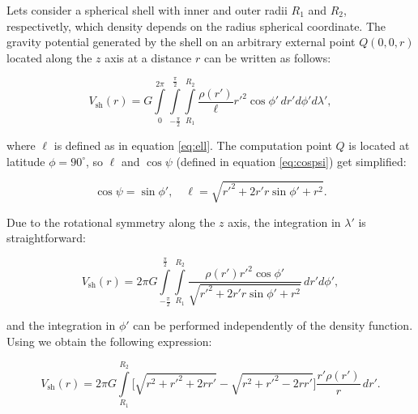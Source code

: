 \documentclass[extra]{gji}
\begin{document}
Lets consider a spherical shell with inner and outer radii $R_1$ and $R_2$, respectivetly, which density depends on the radius spherical coordinate.
The gravity potential generated by the shell on an arbitrary external point $Q(0,0,r)$ located along the $z$ axis at a distance $r$ can be written as follows:


\begin{equation}
    V_\text{sh}(r) = G 
    \int\limits_0^{2\pi}
    \int\limits_{-\frac{\pi}{2}}^\frac{\pi}{2}
    \int\limits_{R_1}^{R_2}
    \frac{\rho(r')}{\ell} {r'}^2 \cos\phi' \, 
    dr' d\phi' d\lambda',
\end{equation}

\noindent where $\ell$ is defined as in equation \ref{eq:ell}.
The computation point $Q$ is located at latitude $\phi=90^\circ$, so $\ell$ and $\cos\psi$ (defined in equation \ref{eq:cospsi}) get simplified:

\begin{equation}
    \cos\psi = \sin\phi', \quad
    \ell = \sqrt{r'^2 + 2 r' r \sin\phi' + r^2}.
\end{equation}

Due to the rotational symmetry along the $z$ axis, the integration in $\lambda'$ is straightforward:

\begin{equation}
    V_\text{sh}(r) = 2\pi G 
    \int\limits_{-\frac{\pi}{2}}^\frac{\pi}{2}
    \int\limits_{R_1}^{R_2}
    \frac{\rho(r') {r'}^2 \cos\phi'}{\sqrt{r'^2 + 2 r' r \sin\phi' + r^2}}
    \, dr' d\phi',
\end{equation}

\noindent and the integration in $\phi'$ can be performed independently of the density function.
Using \citet{sagemath} we obtain the following expression:

{
\begin{equation}
    V_\text{sh}(r) = 2\pi G
    \int\limits_{R_1}^{R_2}
    \Big[ \sqrt{r^2 + r'^2 + 2rr'}  -
    \sqrt{r^2 + r'^2 - 2rr'} 
    \Big] \frac{r'\rho(r')}{r} \, dr'.
\label{eq:shell-pot-sqrts}
\end{equation}
}
\end{document}
